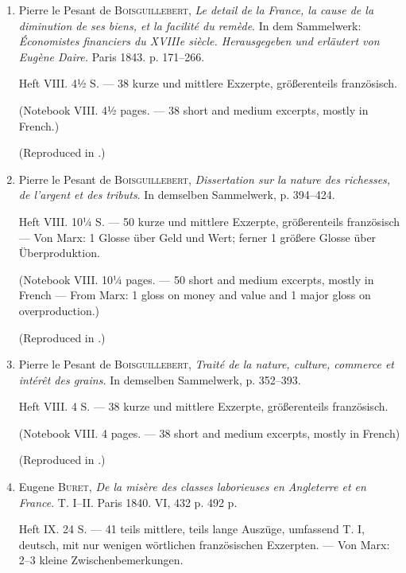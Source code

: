 \begin{enumerate}
    \item Pierre le Pesant de \textsc{Boisguillebert}, \textit{Le detail de la France, la cause de la diminution de ses biens, et la facilité du remède}. In dem Sammelwerk: \textit{Économistes financiers du XVIIIe siècle. Herausgegeben und erläutert von Eugène Daire.} Paris 1843. p. 171--266.
    
    Heft VIII. 4½ S. --- 38 kurze und mittlere Exzerpte, größerenteils französisch.
    
    (Notebook VIII. 4½ pages. --- 38 short and medium excerpts, mostly in French.)
    
    (Reproduced in .)
    
    \item Pierre le Pesant de \textsc{Boisguillebert}, \textit{Dissertation sur la nature des richesses, de l'argent et des tributs}. In demselben Sammelwerk, p. 394--424.
    
    Heft VIII. 10¼ S. --- 50 kurze und mittlere Exzerpte, größerenteils französisch --- Von Marx: 1 Glosse über Geld und Wert; ferner 1 größere Glosse über Überproduktion.
    
    (Notebook VIII. 10¼ pages. --- 50 short and medium excerpts, mostly in French --- From Marx: 1 gloss on money and value and 1 major gloss on overproduction.)
    
    (Reproduced in .)
    
    \item Pierre le Pesant de \textsc{Boisguillebert}, \textit{Traité de la nature, culture, commerce et intérêt des grains.} In demselben Sammelwerk, p. 352--393.
    
    Heft VIII. 4 S. --- 38 kurze und mittlere Exzerpte, größerenteils französisch.
    
    (Notebook VIII. 4 pages. --- 38 short and medium excerpts, mostly in French)
    
    (Reproduced in .)
    
    \item Eugene \textsc{Buret}, \textit{De la misère des classes laborieuses en Angleterre et en France}. T. I--II. Paris 1840. VI, 432 p. 492 p.
    
    Heft IX. 24 S. --- 41 teils mittlere, teils lange Auszüge, umfassend T. I, deutsch, mit nur wenigen wörtlichen französischen Exzerpten. --- Von Marx: 2--3 kleine Zwischenbemerkungen.
    

\end{enumerate}
